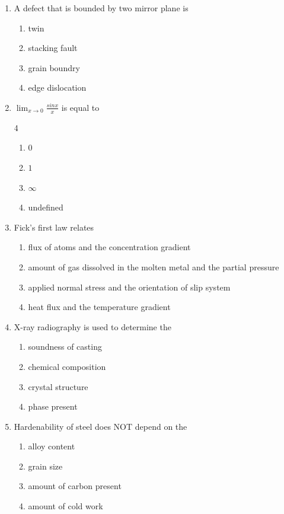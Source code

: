 \documentclass[journal]{IEEEtran}
\theoremstyle{remark}
\begin{document}
\begin{enumerate}
\item A defect that is bounded by two mirror plane is
\hfill{}
\begin{multicols}{4}
\begin{enumerate}
\item twin
\item stacking fault
\item grain boundry
\item edge dislocation
\end{enumerate}
\end{multicols}

\item  $\lim_{x \to 0} \frac{sinx}{x}$ is equal to\hfill{}

\begin {multicols}{4}
\begin{enumerate}
\item $0$
\item $1$
\item $\infty$
\item undefined
\end{enumerate}
\end{multicols}

\item  Fick's first law relates
\hfill{}
\begin{enumerate}
\item flux of atoms and the concentration gradient
\item amount of gas dissolved in the molten metal and the partial pressure
\item applied normal stress and the orientation of slip system
\item heat flux and the temperature gradient
\end{enumerate}

\item  X-ray radiography is used to determine the \hfill{}
\begin{multicols}{2}
\begin{enumerate}
\item soundness of casting
\item chemical composition
\item crystal structure
\item phase present
\end{enumerate}
\end{multicols}

\item Hardenability of steel does NOT depend on the
\begin{multicols}{2}
\begin{enumerate}
\item alloy content
\item grain size
\item amount of carbon present
\item amount of cold work
\end{enumerate}
\end{multicols}


\end{enumerate}
\end{document}
